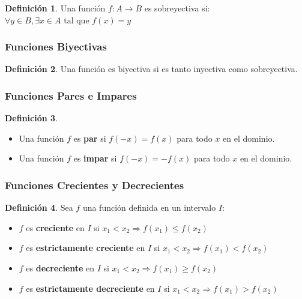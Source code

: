 \documentclass[12pt, a4paper, oneside]{book}
\theoremstyle{definition}
\newtheorem{definicion}{Definición}[chapter]
\begin{document}
\begin{definicion}
Una función $f: A \rightarrow B$ es sobreyectiva si:
$\forall y \in B, \exists x \in A \text{ tal que } f(x) = y$
\end{definicion}

\subsubsection{Funciones Biyectivas}

\begin{definicion}
Una función es biyectiva si es tanto inyectiva como sobreyectiva.
\end{definicion}

\subsubsection{Funciones Pares e Impares}

\begin{definicion}
\begin{itemize}
    \item Una función $f$ es \textbf{par} si $f(-x) = f(x)$ para todo $x$ en el dominio.
    \item Una función $f$ es \textbf{impar} si $f(-x) = -f(x)$ para todo $x$ en el dominio.
\end{itemize}
\end{definicion}

\subsubsection{Funciones Crecientes y Decrecientes}

\begin{definicion}
Sea $f$ una función definida en un intervalo $I$:
\begin{itemize}
    \item $f$ es \textbf{creciente} en $I$ si $x_1 < x_2 \Rightarrow f(x_1) \leq f(x_2)$
    \item $f$ es \textbf{estrictamente creciente} en $I$ si $x_1 < x_2 \Rightarrow f(x_1) < f(x_2)$
    \item $f$ es \textbf{decreciente} en $I$ si $x_1 < x_2 \Rightarrow f(x_1) \geq f(x_2)$
    \item $f$ es \textbf{estrictamente decreciente} en $I$ si $x_1 < x_2 \Rightarrow f(x_1) > f(x_2)$
\end{itemize}
\end{definicion}
\end{document}
